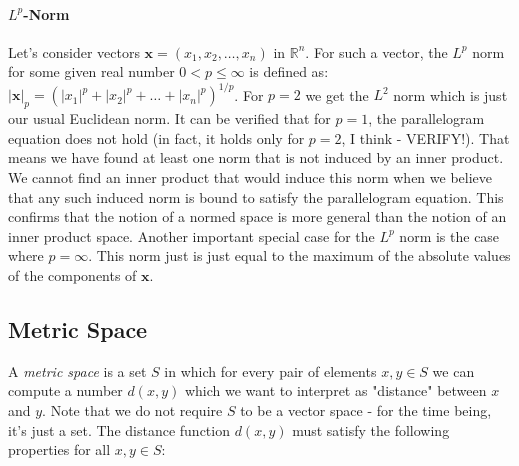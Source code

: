 \paragraph{$L^p$-Norm} Let's consider vectors $\mathbf{x} = (x_1, x_2, \ldots, x_n)$ in $\mathbb{R}^n$. For such a vector, the $L^p$ norm for some given real number $0 < p \leq \infty$ is defined as: $ |\mathbf{x}|_p = (|x_1|^p + |x_2|^p + \ldots + |x_n|^p)^{1/p}$. For $p=2$ we get the $L^2$ norm which is just our usual Euclidean norm. It can be verified that for $p=1$, the parallelogram equation does not hold (in fact, it holds only for $p = 2$, I think - VERIFY!). That means we have found at least one norm that is not induced by an inner product. We cannot find an inner product that would induce this norm when we believe that any such induced norm is bound to satisfy the parallelogram equation. This confirms that the notion of a normed space is more general than the notion of an inner product space. Another important special case for the $L^p$ norm is the case where $p = \infty$. This norm just is just equal to the maximum of the absolute values of the components of $\mathbf{x}$.






\subsection{Metric Space}
A \emph{metric space} is a set $S$ in which for every pair of elements $x,y \in S$ we can compute a number $d(x,y)$ which we want to interpret as "distance" between $x$ and $y$. Note that we do not require $S$ to be a vector space - for the time being, it's just a set. The distance function $d(x,y)$ must satisfy the following properties for all $x,y \in S$:

